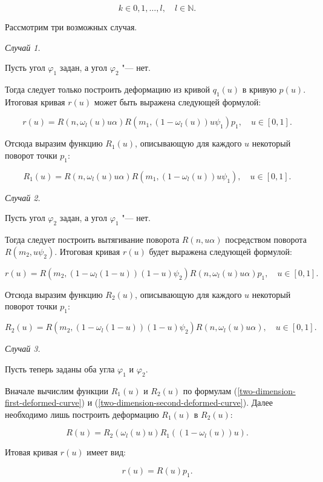 $$
k \in {0,1,\dots,l}, \quad l \in \mathbb{N}.
$$

Рассмотрим три возможных случая.

\bigskip
\textit{Случай 1.}

Пусть угол $\varphi_1$ задан, а угол $\varphi_2$ "--- нет.

Тогда следует только построить деформацию из кривой $q_1(u)$ в кривую $p(u)$. Итоговая кривая $r(u)$ может быть
выражена следующей формулой:

$$
r(u)=R(n,\omega_l(u)u\alpha)R(m_1,(1-\omega_l(u))u\psi_1)p_1, \quad u \in [0,1].
$$

Отсюда выразим функцию $R_1(u)$, описывающую для каждого $u$ некоторый поворот точки $p_1$:

\begin{equation}
R_1(u)=R(n,\omega_l(u)u\alpha)R(m_1,(1-\omega_l(u))u\psi_1), \quad u \in [0,1].
\label{two-dimension-first-deformed-curve}
\end{equation}

\bigskip
\textit{Случай 2.}

Пусть угол $\varphi_2$ задан, а угол $\varphi_1$ "--- нет.

Тогда следует построить вытягивание поворота $R(n,u\alpha)$ посредством поворота $R(m_2,u\psi_2)$. Итоговая кривая
$r(u)$ будет выражена следующей формулой:

$$
r(u)=R(m_2,(1-\omega_l(1-u))(1-u)\psi_2)R(n,\omega_l(u)u\alpha)p_1, \quad u \in [0,1].
$$

Отсюда выразим функцию $R_2(u)$, описывающую для каждого $u$ некоторый поворот точки $p_1$:

\begin{equation}
R_2(u)=R(m_2,(1-\omega_l(1-u))(1-u)\psi_2)R(n,\omega_l(u)u\alpha), \quad u \in [0,1].
\label{two-dimension-second-deformed-curve}
\end{equation}

\bigskip
\textit{Случай 3.}

Пусть теперь заданы оба угла $\varphi_1$ и $\varphi_2$.

Вначале вычислим функции $R_1(u)$ и $R_2(u)$ по формулам (\ref{two-dimension-first-deformed-curve}) и
(\ref{two-dimension-second-deformed-curve}). Далее необходимо лишь построить деформацию $R_1(u)$ в $R_2(u)$:

$$
R(u)=R_2(\omega_l(u)u)R_1((1-\omega_l(u))u).
$$

Итовая кривая $r(u)$ имеет вид:

$$
r(u)=R(u)p_1.
$$

